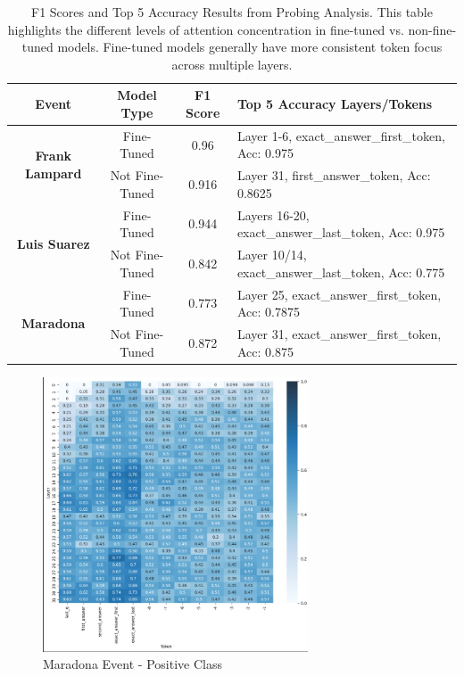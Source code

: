 \documentclass{article}
\begin{document}
\begin{table}[b]
    \centering
    \renewcommand{\arraystretch}{1.2} %
    \begin{adjustbox}{width=0.95\textwidth} %
    \begin{tabular}{|c|c|c|p{8cm}|} %
        \hline
        \textbf{Event} & \textbf{Model Type} & \textbf{F1 Score} & \textbf{Top 5 Accuracy Layers/Tokens} \\
        \hline
        \multirow{2}{*}{\textbf{Frank Lampard}} & Fine-Tuned & 0.96 & Layer 1-6, exact\_answer\_first\_token, Acc: 0.975 \\
        & Not Fine-Tuned & 0.916 & Layer 31, first\_answer\_token, Acc: 0.8625 \\
        \hline
        \multirow{2}{*}{\textbf{Luis Suarez}} & Fine-Tuned & 0.944 & Layers 16-20, exact\_answer\_last\_token, Acc: 0.975 \\
        & Not Fine-Tuned & 0.842 & Layer 10/14, exact\_answer\_last\_token, Acc: 0.775 \\
        \hline
        \multirow{2}{*}{\textbf{Maradona}} & Fine-Tuned & 0.773 & Layer 25, exact\_answer\_first\_token, Acc: 0.7875 \\
        & Not Fine-Tuned & 0.872 & Layer 31, exact\_answer\_first\_token, Acc: 0.875 \\
        \hline
    \end{tabular}
    \end{adjustbox}
    \caption{F1 Scores and Top 5 Accuracy Results from Probing Analysis. This table highlights the different levels of attention concentration in fine-tuned vs. non-fine-tuned models. Fine-tuned models generally have more consistent token focus across multiple layers.}
    \label{tab:f1_scores}
\end{table}

\clearpage


\begin{figure}[p]
    \centering
    \includegraphics[width=0.7\textwidth]{maradona-positiveclass.jpg}
    \caption{Maradona Event - Positive Class}
    \label{fig:maradona-positive}
\end{figure}
\end{document}
